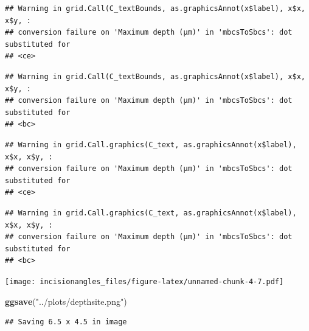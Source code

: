 \documentclass[
]{article}
\newenvironment{Shaded}{\begin{snugshade}}{\end{snugshade}}
\newcommand{\FunctionTok}[1]{\textcolor[rgb]{0.13,0.29,0.53}{\textbf{#1}}}
\newcommand{\NormalTok}[1]{#1}
\newcommand{\StringTok}[1]{\textcolor[rgb]{0.31,0.60,0.02}{#1}}
\begin{document}
\begin{verbatim}
## Warning in grid.Call(C_textBounds, as.graphicsAnnot(x$label), x$x, x$y, :
## conversion failure on 'Maximum depth (μm)' in 'mbcsToSbcs': dot substituted for
## <ce>
\end{verbatim}

\begin{verbatim}
## Warning in grid.Call(C_textBounds, as.graphicsAnnot(x$label), x$x, x$y, :
## conversion failure on 'Maximum depth (μm)' in 'mbcsToSbcs': dot substituted for
## <bc>
\end{verbatim}

\begin{verbatim}
## Warning in grid.Call.graphics(C_text, as.graphicsAnnot(x$label), x$x, x$y, :
## conversion failure on 'Maximum depth (μm)' in 'mbcsToSbcs': dot substituted for
## <ce>
\end{verbatim}

\begin{verbatim}
## Warning in grid.Call.graphics(C_text, as.graphicsAnnot(x$label), x$x, x$y, :
## conversion failure on 'Maximum depth (μm)' in 'mbcsToSbcs': dot substituted for
## <bc>
\end{verbatim}

\texttt{[image: incisionangles\_files/figure-latex/unnamed-chunk-4-7.pdf]}

\begin{Shaded}
\begin{Highlighting}[]
\FunctionTok{ggsave}\NormalTok{(}\StringTok{"../plots/depthsite.png"}\NormalTok{)}
\end{Highlighting}
\end{Shaded}

\begin{verbatim}
## Saving 6.5 x 4.5 in image
\end{verbatim}
\end{document}
